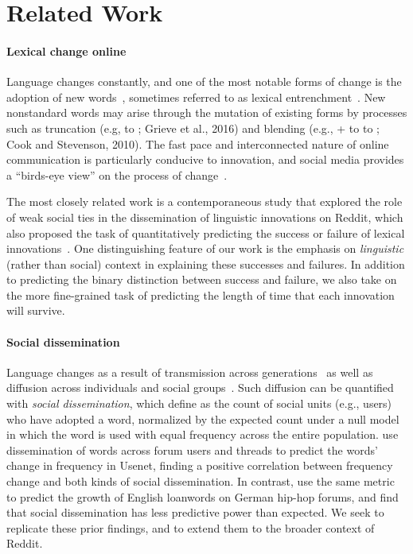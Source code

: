 \section{Related Work}

\paragraph{Lexical change online}

Language changes constantly, and one of the most notable forms of change is the adoption of new words~\cite{metcalf2004}, sometimes referred to as lexical entrenchment~\cite{chesley2010}.
New nonstandard words may arise through the mutation of existing forms by processes such as truncation (e.g,  to ;\nocite{grieve2016} Grieve et al., 2016) and blending (e.g., + to  to ;\nocite{cook2010blend} Cook and Stevenson, 2010). 
The fast pace and interconnected nature of online communication is particularly conducive to innovation, and social media provides a ``birds-eye view'' on the process of change~\cite{danescu2013,kershaw2016,tsur2015}.

The most closely related work is a contemporaneous study that explored the role of weak social ties in the dissemination of linguistic innovations on Reddit, which also proposed the task of quantitatively predicting the success or failure of lexical innovations~\cite{tredici2018}.
One distinguishing feature of our work is the emphasis on \emph{linguistic} (rather than social) context in explaining these successes and failures. In addition to predicting the binary distinction between success and failure, we also take on the more fine-grained task of predicting the length of time that each innovation will survive.

\paragraph{Social dissemination}
Language changes as a result of transmission across generations~\cite{labov2007} as well as diffusion across individuals and social groups~\cite{bucholtz1999}.
Such diffusion can be quantified with \emph{social dissemination}, which  define as the count of social units (e.g., users) who have adopted a word, normalized by the expected count under a null model in which the word is used with equal frequency across the entire population.
 use dissemination of words across forum users and threads to predict the words' change in frequency in Usenet, finding a positive correlation between frequency change and both kinds of social dissemination.
In contrast,  use the same metric to predict the growth of English loanwords on German hip-hop forums, and find that social dissemination has less predictive power than expected.
We seek to replicate these prior findings, and to extend them to the broader context of Reddit.

